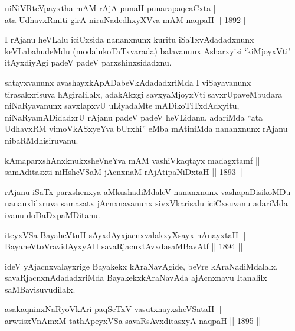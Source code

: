 \begin{shl}
niNiVRteV\s payxtha mAM rAjA punaH punarapaqcaCxta || \\
ata UdhavxRmiti girA niruNadedhxyXVva mAM naqpaH \hfill || 1892 ||
  
\end{shl}

\begin{artha}
I rAjanu heVLalu iciCxsida nananxnunx kuritu iSaTxvAdadadxnunx
keVLabahudeMdu (modalukoTaTxvarada) balavanunx Asharxyisi `kiMjoyxVti'
itAyxdiyAgi padeV padeV parxshinxsidadxnu.
\end{artha}

\begin{artha}
satayxvanunx avashayxkApADabeVkAdadadxriMda I viSayavanunx
tirasakxrisuva hAgiralilalx, adakAkxgi savxyaMjoyxVti
savxrUpaveMbudara niNaRyavanunx savxlapxvU uLiyadaMte
mADikoTiTxdAdxyitu, niNaRyamADidadxrU rAjanu padeV padeV heVLidanu,
adariMda ``ata UdhavxRM vimoVkASxyeYva bUrxhi'' eMba mAtiniMda nananxnunx rAjanu nibaRMdhisiruvanu.
\end{artha}

\begin{shl}
kAmaparxshAnxknukxsheVneYva mAM vashiVkaqtayx madagxtamf || \\
samAditasxti niHsheVSaM jAcnxnaM rAjA\s tipaNiDxtaH \hfill || 1893 ||
  
\end{shl}

\begin{artha}
rAjanu iSaTx parxshenxya aMkushadiMdaleV nananxnunx vashapaDisikoMDu
nananxlilxruva samasatx jAcnxnavanunx sivxVkarisalu iciCxsuvanu
adariMda ivanu doDaDxpaMDitanu.
\end{artha}

\begin{shl}
iteyxVSa BayaheVtuH sAyxdAyxjacnxvalakxyXsayx nAnayxtaH || \\
BayaheVtoVravidAyxyAH savaRjacnxtAvxdasaMBavAtf \hfill || 1894 ||
  
\end{shl}

\begin{artha}
ideV yAjacnxvalayxrige Bayakekx kAraNavAgide, beVre kAraNadiMdalalx,
savaRjacnxnAdadadxriMda BayakekxkAraNavAda ajAcnxnavu Itanalilx
saMBavisuvudilalx.
\end{artha}

\begin{shl}
asakaqninxNaRyoV\s kAri paqSeTxV vasutxnayxsheVSataH || \\
arwtisxVnAmxM tathA\s peyxVSa savaRsAvxditasxyA naqpaH \hfill || 1895 ||
  
\end{shl}

